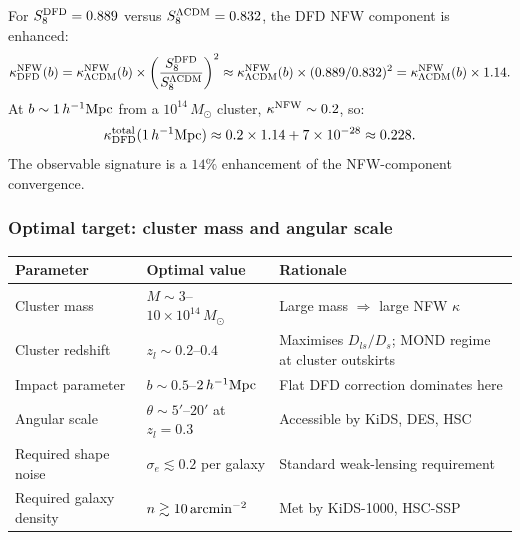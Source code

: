 \documentclass[11pt]{article}
\newcommand{\ee}[1]{\times 10^{#1}}
\newcommand{\DFD}{{\rm DFD}}
\newcommand{\LCDM}{\Lambda{\rm CDM}}
\begin{document}
For $S_8^{\DFD} = 0.889$ versus $S_8^{\LCDM} = 0.832$, the DFD NFW
component is enhanced:
\begin{equation}
  \kappa_{\DFD}^{\rm NFW}(b)
  = \kappa_{\LCDM}^{\rm NFW}(b)\times\left(\frac{S_8^{\DFD}}{S_8^{\LCDM}}\right)^2
  \approx \kappa_{\LCDM}^{\rm NFW}(b)\times(0.889/0.832)^2
  = \kappa_{\LCDM}^{\rm NFW}(b)\times 1.14.
\end{equation}
At $b \sim 1\,h^{-1}{\rm Mpc}$ from a $10^{14}\,M_\odot$ cluster,
$\kappa^{\rm NFW} \sim 0.2$, so:
\begin{equation}
  \kappa_{\DFD}^{\rm total}(1\,h^{-1}{\rm Mpc})
  \approx 0.2\times 1.14 + 7\ee{-28}
  \approx 0.228.
\end{equation}
The observable signature is a $14\%$ enhancement of the NFW-component
convergence.

\subsubsection{Optimal target: cluster mass and angular scale}

\begin{center}
\begin{tabular}{lll}
\toprule
Parameter & Optimal value & Rationale \\
\midrule
Cluster mass & $M \sim 3$--$10\times 10^{14}\,M_\odot$ &
  Large mass $\Rightarrow$ large NFW $\kappa$ \\
Cluster redshift & $z_l \sim 0.2$--$0.4$ &
  Maximises $D_{ls}/D_s$; MOND regime at cluster outskirts \\
Impact parameter & $b \sim 0.5$--$2\,h^{-1}{\rm Mpc}$ &
  Flat DFD correction dominates here \\
Angular scale & $\theta \sim 5'$--$20'$ at $z_l = 0.3$ &
  Accessible by KiDS, DES, HSC \\
Required shape noise & $\sigma_e \lesssim 0.2$ per galaxy &
  Standard weak-lensing requirement \\
Required galaxy density & $n \gtrsim 10\,{\rm arcmin}^{-2}$ &
  Met by KiDS-1000, HSC-SSP \\
\bottomrule
\end{tabular}
\end{center}
\end{document}
